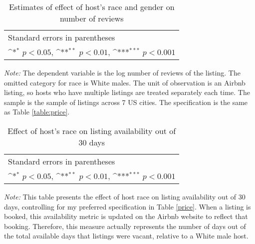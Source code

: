 \begin{table}[htbp]\centering
	\def\sym#1{\ifmmode^{#1}\else\(^{#1}\)\fi}
	\caption{Estimates of effect of host’s race and gender on number of reviews}
	\begin{tabular}{l*{4}{c}}
		\hline\hline
		
		\hline\hline
		\multicolumn{5}{l}{\footnotesize Standard errors in parentheses}\\
		\multicolumn{5}{l}{\footnotesize \sym{*} \(p<0.05\), \sym{**} \(p<0.01\), \sym{***} \(p<0.001\)}\\
	\end{tabular}
\label{table:num_reviews}

	\begin{tablenotes}
		\item {\it Note:} The dependent variable is the log number of reviews of the listing. The omitted category for race is White males. The unit of observation is an Airbnb listing, so hosts who have multiple listings are treated separately each time. The sample is the sample of listings across 7 US cities. The specification is the same as Table \ref{table:price}.	
	\end{tablenotes}
\end{table}


\begin{table}[htbp]\centering
	\def\sym#1{\ifmmode^{#1}\else\(^{#1}\)\fi}
	\caption{Effect of host’s race on listing availability out of 30 days}
	\begin{tabular}{l*{1}{c}}
		\hline\hline
		
		\hline\hline
		\multicolumn{2}{l}{\footnotesize Standard errors in parentheses}\\
		\multicolumn{2}{l}{\footnotesize \sym{*} \(p<0.05\), \sym{**} \(p<0.01\), \sym{***} \(p<0.001\)}\\
	\end{tabular}
\label{table:availability}
	\begin{tablenotes}
		\item {\it Note:} This table presents the effect of host race on listing availability out of 30 days, controlling for my preferred specification in Table \ref{price}. When a listing is booked, this availability metric is updated on the Airbnb website to reflect that booking. Therefore, this measure actually represents the number of days out of the total available days that listings were vacant, relative to a White male host.
	\end{tablenotes}
\end{table}


